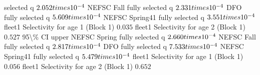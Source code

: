 \documentclass[
]{article}
\begin{document}
selected q \(2.052\\times 10^{-4}\) NEFSC Fall fully selected q
\(2.331\\times 10^{-4}\) DFO fully selected q \(5.609\\times 10^{-4}\)
NEFSC Spring41 fully selected q \(3.551\\times 10^{-4}\) fleet1
Selectivity for age 1 (Block 1) \(0.035\) fleet1 Selectivity for age 2
(Block 1) \(0.527\) 95\textbackslash\% CI upper NEFSC Spring fully
selected q \(2.660\\times 10^{-4}\) NEFSC Fall fully selected q
\(2.817\\times 10^{-4}\) DFO fully selected q \(7.533\\times 10^{-4}\)
NEFSC Spring41 fully selected q \(5.479\\times 10^{-4}\) fleet1
Selectivity for age 1 (Block 1) \(0.056\) fleet1 Selectivity for age 2
(Block 1) \(0.652\)
\end{document}
